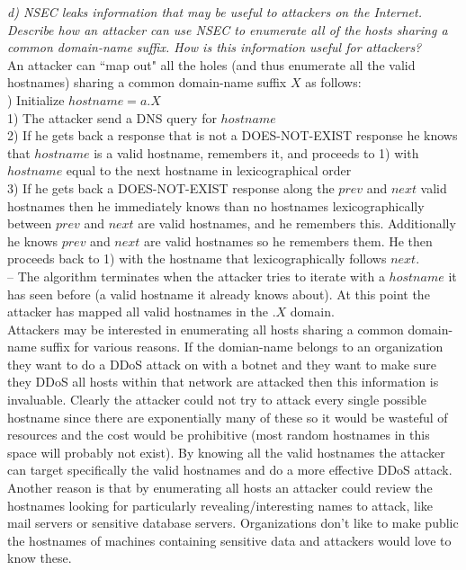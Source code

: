 \noindent \textit{d) NSEC leaks information that may be useful to attackers on the Internet. Describe how an attacker can use NSEC to enumerate all of the hosts sharing a common domain-name suffix. How is this information useful for attackers?}\\

An attacker can ``map out" all the holes (and thus enumerate all the valid hostnames) sharing a common domain-name suffix $X$ as follows: \\

) Initialize $hostname=a.X$\\
1) The attacker send a DNS query for $hostname$\\
2) If he gets back a response that is not a DOES-NOT-EXIST response he knows that $hostname$ is a valid hostname, remembers it, and proceeds to 1) with $hostname$ equal to the next hostname in lexicographical order\\
3) If he gets back a DOES-NOT-EXIST response along the $prev$ and $next$ valid hostnames then he immediately knows than no hostnames lexicographically between $prev$ and $next$ are valid hostnames, and he remembers this. Additionally he knows $prev$ and $next$ are valid hostnames so he remembers them. He then proceeds back to 1) with the hostname that lexicographically follows $next$.  \\
-- The algorithm terminates when the attacker tries to iterate with a $hostname$ it has seen before (a valid hostname it already knows about). At this point the attacker has mapped all valid hostnames in the $.X$ domain.\\

Attackers may be interested in enumerating all hosts sharing a common domain-name suffix for various reasons. If the domian-name belongs to an organization they want to do a DDoS attack on with a botnet and they want to make sure they DDoS all hosts within that network are attacked then this information is invaluable. Clearly the attacker could not try to attack every single possible hostname since there are exponentially many of these so it would be wasteful of resources and the cost would be prohibitive (most random hostnames in this space will probably not exist). By knowing all the valid hostnames the attacker can target specifically the valid hostnames and do a more effective DDoS attack. Another reason is that by enumerating all hosts an attacker could review the hostnames looking for particularly revealing/interesting names to attack, like mail servers or sensitive database servers. Organizations don't like to make public the hostnames of machines containing sensitive data and attackers would love to know these. \\

